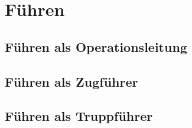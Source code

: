 \section{Führen}
\subsection{Führen als Operationsleitung}
\subsection{Führen als Zugführer}
\subsection{Führen als Truppführer}
